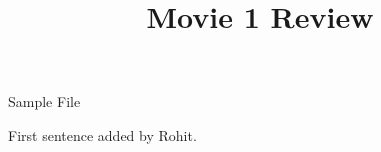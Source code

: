 \documentclass{article}
\begin{document}
\title{Movie 1 Review}


\centerline{\sc \large Sample File}
\vspace{.5pc}
\centerline{\sc }
\vspace{2pc}

First sentence added by Rohit.
\end{document}
